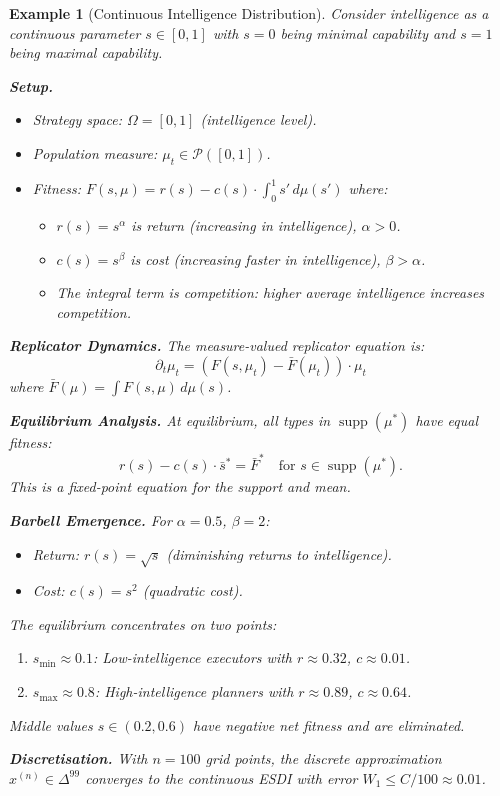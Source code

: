 \documentclass[12pt]{article}
\newtheorem{example}[theorem]{Example}
\DeclareMathOperator{\supp}{supp}
\begin{document}
\begin{example}[Continuous Intelligence Distribution]
\label{ex:continuous-intelligence}
Consider intelligence as a continuous parameter $s \in [0, 1]$ with $s = 0$ being minimal capability and $s = 1$ being maximal capability.

\textbf{Setup.}
\begin{itemize}
    \item Strategy space: $\Omega = [0, 1]$ (intelligence level).
    \item Population measure: $\mu_t \in \mathcal{P}([0, 1])$.
    \item Fitness: $F(s, \mu) = r(s) - c(s) \cdot \int_0^1 s' \, d\mu(s')$ where:
    \begin{itemize}
        \item $r(s) = s^\alpha$ is return (increasing in intelligence), $\alpha > 0$.
        \item $c(s) = s^\beta$ is cost (increasing faster in intelligence), $\beta > \alpha$.
        \item The integral term is competition: higher average intelligence increases competition.
    \end{itemize}
\end{itemize}

\textbf{Replicator Dynamics.}
The measure-valued replicator equation is:
\[
\partial_t \mu_t = (F(s, \mu_t) - \bar{F}(\mu_t)) \cdot \mu_t
\]
where $\bar{F}(\mu) = \int F(s, \mu) \, d\mu(s)$.

\textbf{Equilibrium Analysis.}
At equilibrium, all types in $\supp(\mu^*)$ have equal fitness:
\[
r(s) - c(s) \cdot \bar{s}^* = \bar{F}^* \quad \text{for } s \in \supp(\mu^*).
\]
This is a fixed-point equation for the support and mean.

\textbf{Barbell Emergence.}
For $\alpha = 0.5$, $\beta = 2$:
\begin{itemize}
    \item Return: $r(s) = \sqrt{s}$ (diminishing returns to intelligence).
    \item Cost: $c(s) = s^2$ (quadratic cost).
\end{itemize}
The equilibrium concentrates on two points:
\begin{enumerate}
    \item $s_{\min} \approx 0.1$: Low-intelligence executors with $r \approx 0.32$, $c \approx 0.01$.
    \item $s_{\max} \approx 0.8$: High-intelligence planners with $r \approx 0.89$, $c \approx 0.64$.
\end{enumerate}
Middle values $s \in (0.2, 0.6)$ have negative net fitness and are eliminated.

\textbf{Discretisation.}
With $n = 100$ grid points, the discrete approximation $x^{(n)} \in \Delta^{99}$ converges to the continuous ESDI with error $W_1 \leq C / 100 \approx 0.01$.
\end{example}
\end{document}
